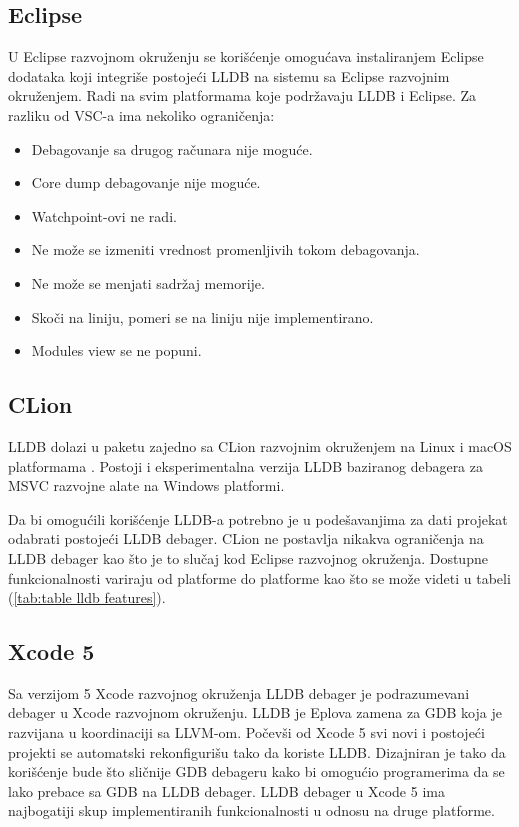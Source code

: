 \documentclass[a4paper]{article}
\begin{document}
\subsection*{Eclipse}
U Eclipse razvojnom okruženju se korišćenje omogućava instaliranjem Eclipse dodataka \cite{eclipse_plugin} koji integriše postojeći LLDB na sistemu sa Eclipse razvojnim okruženjem. Radi na svim platformama koje podržavaju LLDB i Eclipse. Za razliku od VSC-a ima nekoliko ograničenja:

\begin{itemize}
\item Debagovanje sa drugog računara nije moguće.
\item Core dump debagovanje nije moguće.
\item Watchpoint-ovi ne radi.
\item Ne može se izmeniti vrednost promenljivih tokom debagovanja.
\item Ne može se menjati sadržaj memorije.
\item Skoči na liniju, pomeri se na liniju nije implementirano.
\item Modules view se ne popuni.
\end{itemize}

\subsection*{CLion}
LLDB dolazi u paketu zajedno sa CLion razvojnim okruženjem na Linux i macOS platformama \cite{clion_lldb}. Postoji i eksperimentalna verzija LLDB baziranog debagera za MSVC razvojne alate na Windows platformi.

Da bi omogućili korišćenje LLDB-a potrebno je u podešavanjima za dati projekat odabrati postojeći LLDB debager.  CLion ne postavlja nikakva ograničenja na LLDB debager kao što je to slučaj kod Eclipse razvojnog okruženja.  Dostupne funkcionalnosti variraju od platforme do platforme kao što se može videti u tabeli (\ref{tab:table lldb features}).

\subsection*{Xcode 5}
Sa verzijom 5 Xcode razvojnog okruženja LLDB debager je podrazumevani debager u Xcode razvojnom okruženju. LLDB je Eplova zamena za GDB koja je razvijana u koordinaciji sa LLVM-om. Počevši od Xcode 5 svi novi i postojeći projekti se automatski rekonfigurišu tako da koriste LLDB. Dizajniran je tako da korišćenje bude što sličnije GDB debageru kako bi omogućio programerima da se lako prebace sa GDB na LLDB debager. LLDB debager u Xcode 5 ima najbogatiji skup implementiranih funkcionalnosti u odnosu na druge platforme.
\end{document}
